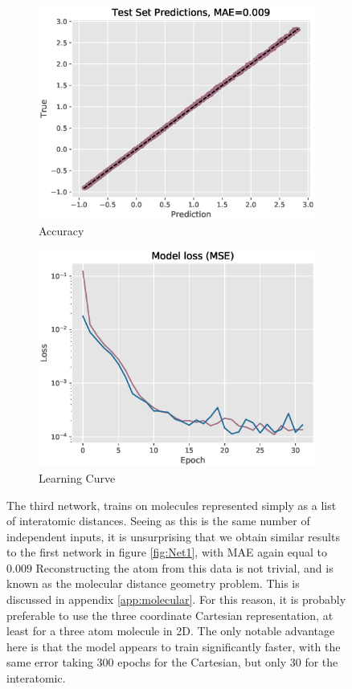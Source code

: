 \documentclass[12pt,a4paper]{article}
\begin{document}
\begin{figure}[h!]
\centering
    \begin{subfigure}[t]{0.49\textwidth}
        \includegraphics[width = \linewidth]{images/prediction3.eps}
        \caption{Accuracy}
        \label{fig:distacc}
    \end{subfigure}
    \begin{subfigure}[t]{0.49\textwidth}
        \includegraphics[width = \linewidth]{images/loss3.eps}
        \caption{Learning Curve}
        \label{fig:distloss}
    \end{subfigure}
\caption{The third network, trains on molecules represented simply as a list of interatomic distances. Seeing as this is the same number of independent inputs, it is unsurprising that we obtain similar results to the first network in figure \ref{fig:Net1}, with MAE again equal to $0.009$ Reconstructing the atom from this data is not trivial, and is known as the molecular distance geometry problem. This is discussed in appendix \ref{app:molecular}. For this reason, it is probably preferable to use the three coordinate Cartesian representation, at least for a three atom molecule in 2D. The only notable advantage here is that the model appears to train significantly faster, with the same error taking 300 epochs for the Cartesian, but only 30 for the interatomic.}
\label{fig:Net3}
\pagebreak
\end{figure}
\end{document}
